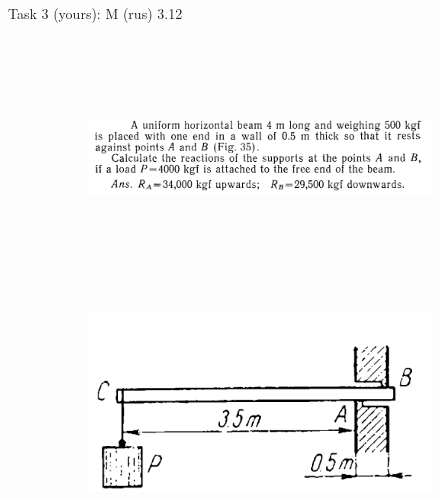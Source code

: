 \documentclass[aspectratio=169]{beamer}
\begin{document}
    \begin{frame}[t]{Task 3 (yours): M (rus) 3.12}
    \framesubtitle{}
        \begin{figure}[H]
            \flushleft
            \begin{subfigure}{0.8\textwidth}
                \includegraphics[height=6cm,width=1\textwidth,keepaspectratio]{image23.png}
                \label{fig:image23}
            \end{subfigure}
            \vspace{-0.5cm}
            \flushright
            \begin{subfigure}{0.4\textwidth}
                \includegraphics[height=6cm,width=1\textwidth,keepaspectratio]{image13.png}
                \label{fig:image13}
            \end{subfigure}
        \end{figure}
    \end{frame}
    
\end{document}
